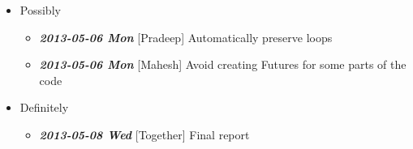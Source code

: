 \documentclass[10pt]{article}
\begin{document}
\begin{itemize}
\item Possibly
\label{sec-7_3}%
\begin{itemize}
\item \textbf{\textit{2013-05-06 Mon}} [Pradeep] Automatically preserve loops
\item \textbf{\textit{2013-05-06 Mon}} [Mahesh] Avoid creating Futures for some parts of the code
\end{itemize}


\item Definitely
\label{sec-7_4}%
\begin{itemize}
\item \textbf{\textit{2013-05-08 Wed}} [Together] Final report
\end{itemize}

\end{itemize} %
\end{document}
